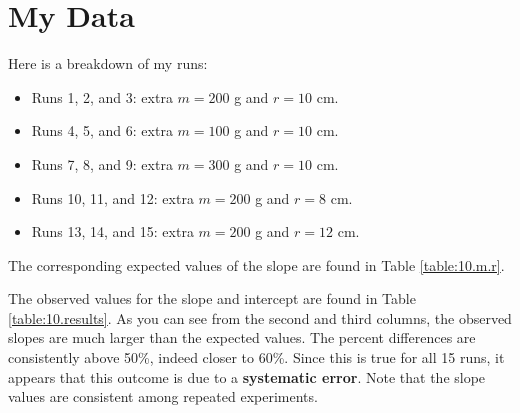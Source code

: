 \section{My Data}
Here is a breakdown of my runs:
\begin{itemize}
    \item Runs 1, 2, and 3: extra $m = 200$ g and $r = 10$ cm.
    \item Runs 4, 5, and 6: extra $m = 100$ g and $r = 10$ cm.
    \item Runs 7, 8, and 9: extra $m = 300$ g and $r = 10$ cm.
    \item Runs 10, 11, and 12: extra $m = 200$ g and $r = 8$ cm.
    \item Runs 13, 14, and 15: extra $m = 200$ g and $r = 12$ cm.
\end{itemize}
The corresponding expected values of the slope are found in Table \ref{table:10.m.r}.

The observed values for the slope and intercept are found in Table \ref{table:10.results}. As you can see from the second and third columns, the observed slopes are much larger than the expected values. The percent differences are consistently above 50\%, indeed closer to 60\%. Since this is true for all 15 runs, it appears that this outcome is due to a \textbf{systematic error}. Note that the slope values are consistent among repeated experiments.


